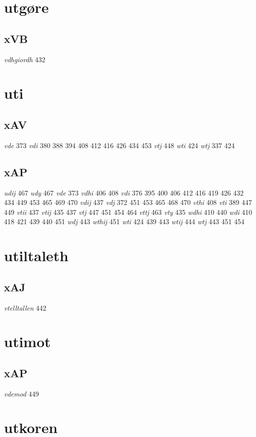 \documentclass[a4paper,twocolumn]{article}
\begin{document}
\section{utgøre}
\label{sec:org7332a74}
\subsection{xVB}
\label{sec:orgec5f1b1}
\emph{vdhgiordh} 432 
\section{uti}
\label{sec:org8b995b3}
\subsection{xAV}
\label{sec:org59cbb82}
\emph{vde} 373 \emph{vdi} 380 388 394 408 412 416 426 434 453 \emph{vtj} 448 \emph{wti} 424 \emph{wtj} 337 424 
\subsection{xAP}
\label{sec:orgf3a3a56}
\emph{udij} 467 \emph{udy} 467 \emph{vde} 373 \emph{vdhi} 406 408 \emph{vdi} 376 395 400 406 412 416 419 426 432 434 449 453 465 469 470 \emph{vdij} 437 \emph{vdj} 372 451 453 465 468 470 \emph{vthi} 408 \emph{vti} 389 447 449 \emph{vtii} 437 \emph{vtij} 435 437 \emph{vtj} 447 451 454 464 \emph{vttj} 463 \emph{vty} 435 \emph{wdhi} 410 440 \emph{wdi} 410 418 421 439 440 451 \emph{wdj} 443 \emph{wthij} 451 \emph{wti} 424 439 443 \emph{wtij} 444 \emph{wtj} 443 451 454 
\section{utiltaleth}
\label{sec:org1a79dbf}
\subsection{xAJ}
\label{sec:org3a0d831}
\emph{vtelltallen} 442 
\section{utimot}
\label{sec:orgc02faf8}
\subsection{xAP}
\label{sec:org4145ded}
\emph{vdemod} 449 
\section{utkoren}
\label{sec:orgbffaf02}
\end{document}
